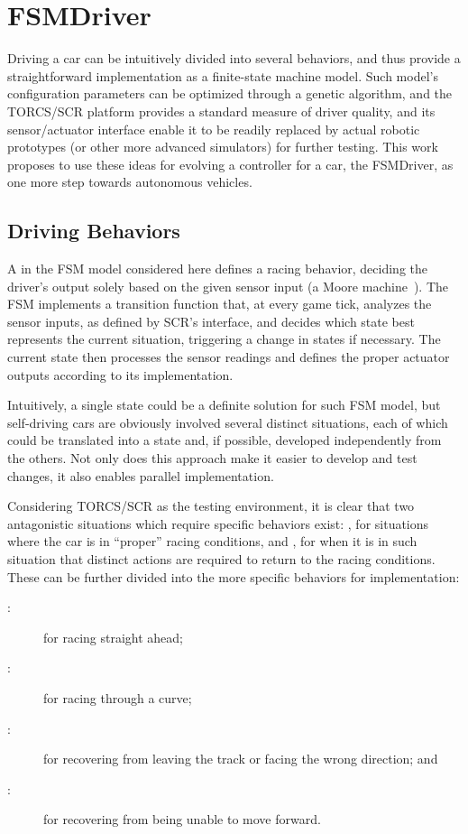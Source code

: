 \section{FSMDriver}\label{sec:3}%
Driving a car can be intuitively divided into several behaviors, and thus provide a straightforward implementation as a finite-state machine model. Such model's configuration parameters can be optimized through a genetic algorithm, and the TORCS/SCR platform provides a standard measure of driver quality, and its sensor/actuator interface enable it to be readily replaced by actual robotic prototypes (or other more advanced simulators) for further testing. This work proposes to use these ideas for evolving a controller for a car, the FSMDriver, as one more step towards autonomous vehicles.






\subsection{Driving Behaviors}%
A  in the FSM model considered here defines a racing behavior, deciding the driver's output solely based on the given sensor input (a Moore machine~\cite{Ajzerman}). The FSM implements a transition function that, at every game tick, analyzes the sensor inputs, as defined by SCR's interface, and decides which state best represents the current situation, triggering a change in states if necessary. The current state then processes the sensor readings and defines the proper actuator outputs according to its implementation.

Intuitively, a single  state could be a definite solution for such FSM model, but self-driving cars are obviously involved several distinct situations, each of which could be translated into a state and, if possible, developed independently from the others. Not only does this approach make it easier to develop and test changes, it also enables parallel implementation.

Considering TORCS/SCR as the testing environment, it is clear that two antagonistic situations which require specific behaviors exist: \racing, for situations where the car is in ``proper'' racing conditions, and \recovery, for when it is in such situation that distinct actions are required to return to the racing conditions. These can be further divided into the more specific behaviors for implementation:
\begin{description}
	\item[\SL:] for racing straight ahead;
	\item[\C:] for racing through a curve;
	\item[\OT:] for recovering from leaving the track or facing the wrong direction; and
	\item[\St:] for recovering from being unable to move forward.
\end{description}

